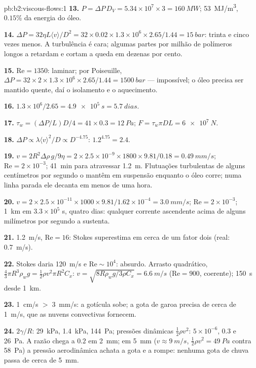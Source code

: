 \begin{solution}{pb:b2:viscous-flows:1}
\textbf{13.} $P = \Delta P\,D_V = 5.34 \times 10^7 \times 3 = \qty{160}{MW}$;
\qty{53}{MJ/m^3}, $0.15\%$ da energia do óleo.

\textbf{14.} $\Delta P = 32\eta L\langle v\rangle/D^2 = 32 \times 0.02 \times 1.3 \times 10^6
\times 2.65/1.44 = \qty{15}{bar}$: trinta e cinco vezes menos. A turbulência é
cara; algumas partes por milhão de polímeros longos a retardam e cortam
a queda em dezenas por cento.

\textbf{15.} $\mathrm{Re} = 1350$: laminar; por Poiseuille, $\Delta P = 32 \times 2 \times 1.3 \times
10^6 \times 2.65/1.44 = \qty{1500}{bar}$ --- impossível; o óleo precisa ser mantido
quente, daí o isolamento e o aquecimento.

\textbf{16.} $1.3 \times 10^6/2.65 = \qty{4.9e5}{s} = \qty{5.7}{dias}$.

\textbf{17.} $\tau_w = (\Delta P/L)D/4 = 41 \times 0.3 = \qty{12}{Pa}$; $F = \tau_w\pi DL =
\qty{6e7}{N}$.

\textbf{18.} $\Delta P \propto \lambda\langle v\rangle^2/D \propto D^{-4.75}$: $1.2^{4.75} = 2.4$.

\textbf{19.} $v = 2R^2\Delta\rho\,g/9\eta = 2 \times 2.5 \times 10^{-9} \times 1800 \times 9.81/
0.18 = \qty{0.49}{mm/s}$; $\mathrm{Re} = 2 \times 10^{-3}$; \qty{41}{min} para atravessar
\qty{1.2}{m}. Flutuações turbulentas de alguns centímetros por segundo
o mantêm em suspensão enquanto o óleo corre; numa linha parada ele decanta em
menos de uma hora.

\textbf{20.} $v = 2 \times 2.5 \times 10^{-11} \times 1000 \times 9.81/1.62 \times 10^{-4} =
\qty{3.0}{mm/s}$; $\mathrm{Re} = 2 \times 10^{-3}$; \qty{1}{km} em $3.3 \times 10^5$ s, quatro
dias: qualquer corrente ascendente acima de alguns milímetros por segundo a sustenta.

\textbf{21.} \qty{1.2}{m/s}, $\mathrm{Re} = 16$: Stokes superestima em cerca de um
fator dois (real: \qty{0.7}{m/s}).

\textbf{22.} Stokes daria \qty{120}{m/s} e $\mathrm{Re} \sim 10^4$: absurdo.
Arrasto quadrático, $\tfrac43\pi R^3\rho_wg = \tfrac12\rho v^2\pi R^2C_x$: $v = \sqrt{8R
\rho_wg/3\rho C_x} = \qty{6.6}{m/s}$ ($\mathrm{Re} = 900$, coerente); \qty{150}{s} desde
\qty{1}{km}.

\textbf{23.} \qty{1}{cm/s} $>$ \qty{3}{mm/s}: a gotícula sobe; a gota de garoa
precisa de cerca de \qty{1}{m/s}, que as nuvens convectivas fornecem.

\textbf{24.} $2\gamma/R$: \qty{29}{kPa}, \qty{1.4}{kPa}, \qty{144}{Pa}; pressões
dinâmicas $\tfrac12\rho v^2$: $5 \times 10^{-6}$, $0.3$ e \qty{26}{Pa}. A razão
chega a $0.2$ em \qty{2}{mm}; em \qty{5}{mm} ($v \approx \qty{9}{m/s}$, $\tfrac12\rho v^2 =
\qty{49}{Pa}$ contra \qty{58}{Pa}) a pressão aerodinâmica achata a
gota e a rompe: nenhuma gota de chuva passa de cerca de \qty{5}{mm}.


\end{solution}
